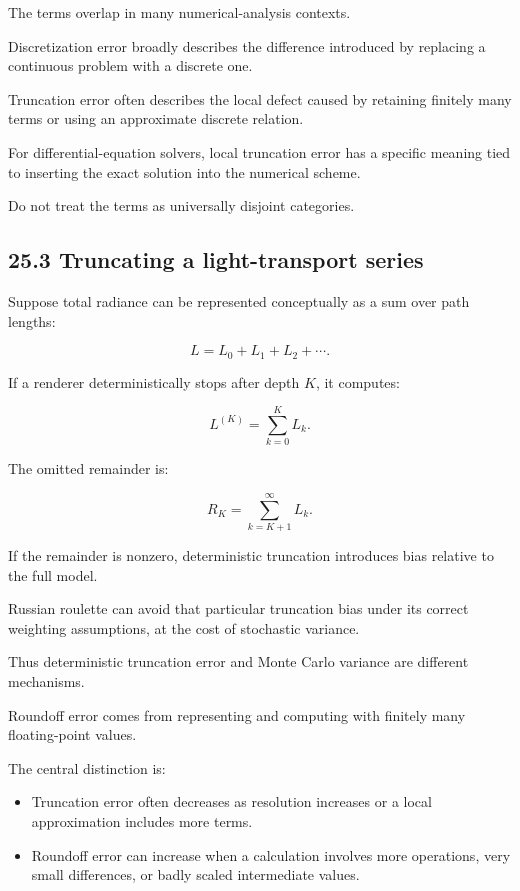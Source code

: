 The terms overlap in many numerical-analysis contexts.

Discretization error broadly describes the difference introduced by replacing a continuous problem with a discrete one.

Truncation error often describes the local defect caused by retaining finitely many terms or using an approximate discrete relation.

For differential-equation solvers, local truncation error has a specific meaning tied to inserting the exact solution into the numerical scheme.

Do not treat the terms as universally disjoint categories.

\subsection{25.3 Truncating a light-transport series}\label{02-foundations-ii-ch029-truncating-a-light-transport-series}

Suppose total radiance can be represented conceptually as a sum over path lengths:

\[ L=L_0+L_1+L_2+\cdots. \]

If a renderer deterministically stops after depth \(K\), it computes:

\[ L^{(K)}=\sum_{k=0}^{K}L_k. \]

The omitted remainder is:

\[ \boxed{ R_K=\sum_{k=K+1}^{\infty}L_k }. \]

If the remainder is nonzero, deterministic truncation introduces bias relative to the full model.

Russian roulette can avoid that particular truncation bias under its correct weighting assumptions, at the cost of stochastic variance.

Thus deterministic truncation error and Monte Carlo variance are different mechanisms.

Roundoff error comes from representing and computing with finitely many floating-point values.

The central distinction is:

\begin{itemize}
\tightlist
\item
  Truncation error often decreases as resolution increases or a local approximation includes more terms.
\item
  Roundoff error can increase when a calculation involves more operations, very small differences, or badly scaled intermediate values.
\end{itemize}

